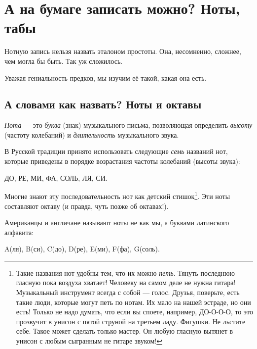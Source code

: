 \chapter{А на бумаге записать можно? Ноты, табы}
\label{ch:encoding}

Нотную запись нельзя назвать эталоном простоты. Она, несомненно, сложнее, чем могла бы быть. Так уж сложилось.

Уважая гениальность предков, мы изучим её такой, какая она есть.


\section{А словами как назвать? Ноты и октавы}
\label{sec:encoding:notes}

\emph{Нота} --- это \emph{буква} (знак) музыкального письма, позволяющая определить \emph{высоту} (частоту колебаний) и \emph{длительность} музыкального звука. 

В Русской традиции принято использовать следующие \emph{семь} названий нот, которые приведены в порядке возрастания частоты колебаний (высоты звука): 
\begin{center}
    ДО, РЕ, МИ, ФА, СОЛЬ, ЛЯ, СИ. 
\end{center}

Многие знают эту последовательность нот как детский стишок\footnote{Такие названия нот удобны тем, что их можно \emph{петь}. Тянуть последнюю гласную пока воздуха хватает! Человеку на самом деле не нужна гитара! Музыкальный инструмент всегда с собой --- голос. Друзья, поверьте, есть такие люди, которые могут петь по нотам. Их мало на нашей эстраде, но они есть! Только не надо думать, что если вы споете, например, ДО-О-О-О, то это прозвучит в унисон с пятой струной на третьем ладу. Фигушки. Не льстите себе. Такое может сделать только мастер. Он любую гласную вытянет в унисон с любым сыгранным не гитаре звуком!}. Эти ноты составляют октаву (и правда, чуть позже об октавах!).

Американцы и англичане называют ноты не как мы, а буквами латинского алфавита: 
\begin{center}
    A(ля), B(си), C(до), D(ре), E(ми), F(фа), G(соль).
\end{center}

